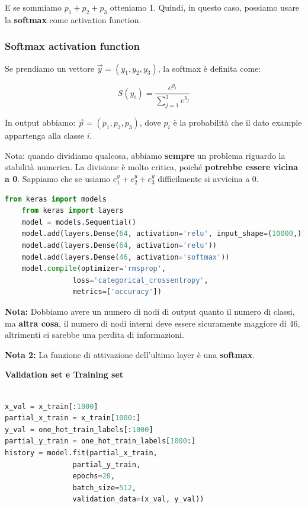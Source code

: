 E se sommiamo $p_1+p_2+p_3$ otteniamo 1. Quindi, in questo caso, possiamo usare
la \textbf{softmax} come activation function.

\subsubsection{Softmax activation function}

Se prendiamo un vettore $\vec{y} = (y_1, y_2, y_3)$, la softmax è definita
come:

\begin{equation}
    S(y_i) = \frac{e^{y_i}}{\sum_{j=1}^{3} e^{y_j}}
\end{equation}

In output abbiamo: $\vec{p} = (p_1, p_2, p_3)$, dove $p_i$ è la probabilità che
il dato example appartenga alla classe $i$.

Nota: quando dividiamo qualcosa, abbiamo \textbf{sempre} un problema riguardo
la stabilità numerica. La divisione è molto critica, poiché \textbf{potrebbe
    essere vicina a 0}. Sappiamo che se usiamo $e^y_1 + e^y_2 + e^y_3$
difficilmente si avvicina a 0.

\begin{lstlisting}[language=Python]
    from keras import models
    from keras import layers
    model = models.Sequential()
    model.add(layers.Dense(64, activation='relu', input_shape=(10000,)))
    model.add(layers.Dense(64, activation='relu'))
    model.add(layers.Dense(46, activation='softmax'))
    model.compile(optimizer='rmsprop',
                loss='categorical_crossentropy',
                metrics=['accuracy'])
\end{lstlisting}

\textbf{Nota:} Dobbiamo avere un numero di nodi di output quanto il numero di classi,
ma \textbf{altra cosa}, il numero di nodi interni deve essere sicuramente
maggiore di 46, altrimenti ci sarebbe una perdita di informazioni.

\textbf{Nota 2:} La funzione di attivazione dell'ultimo layer è una \textbf{softmax}.

\textbf{Validation set e Training set}
\begin{lstlisting}[language=Python]
   
x_val = x_train[:1000]
partial_x_train = x_train[1000:]
y_val = one_hot_train_labels[:1000]
partial_y_train = one_hot_train_labels[1000:]
history = model.fit(partial_x_train,
                partial_y_train,
                epochs=20,
                batch_size=512,
                validation_data=(x_val, y_val))
\end{lstlisting}

